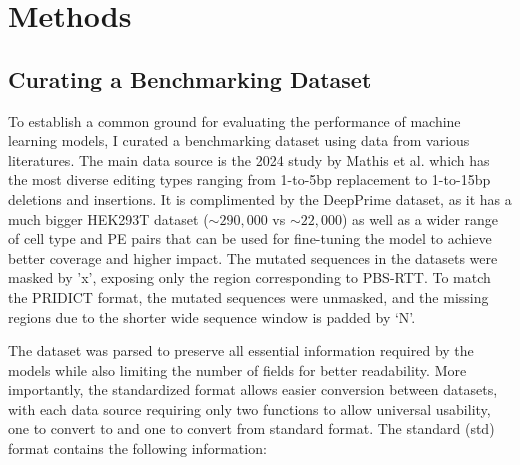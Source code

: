 \chapter{Methods}

\minitoc

\section{Curating a Benchmarking Dataset}

To establish a common ground for evaluating the performance of machine learning models, I curated a benchmarking dataset using data from various literatures. The main data source is the 2024 study by Mathis et al. which has the most diverse editing types ranging from 1-to-5bp replacement to 1-to-15bp deletions and insertions\cite{mathisMachineLearningPrediction2024}. It is complimented by the DeepPrime dataset, as it has a much bigger HEK293T dataset ($\sim290,000$ vs $\sim22,000$) as well as a wider range of cell type and PE pairs that can be used for fine-tuning the model to achieve better coverage and higher impact\cite{yuPredictionEfficienciesDiverse2023}. The mutated sequences in the datasets were masked by 'x', exposing only the region corresponding to PBS-RTT. To match the PRIDICT format, the mutated sequences were unmasked, and the missing regions due to the shorter wide sequence window is padded by `N'.


The dataset was parsed to preserve all essential information required by the models while also limiting the number of fields for better readability. More importantly, the standardized format allows easier conversion between datasets, with each data source requiring only two functions to allow universal usability, one to convert to and one to convert from standard format. The standard (std) format contains the following information:

